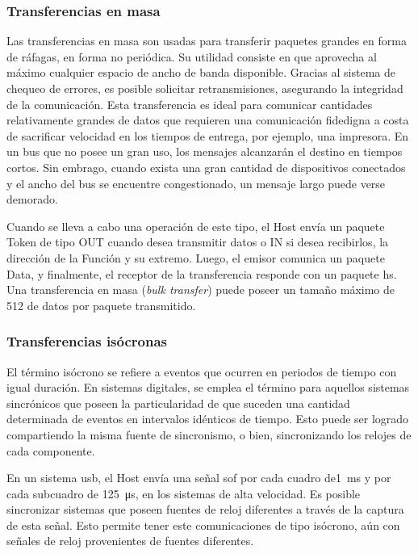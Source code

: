 \subsubsection{Transferencias en masa}
	Las transferencias en masa son usadas para transferir paquetes grandes en forma de ráfagas, en forma no periódica. Su utilidad consiste en que aprovecha al máximo cualquier espacio de ancho de banda disponible. Gracias al sistema de chequeo de errores, es posible solicitar retransmisiones, asegurando la integridad de la comunicación. Esta transferencia es ideal para comunicar cantidades relativamente grandes de datos que requieren una comunicación fidedigna a costa de sacrificar velocidad en los tiempos de entrega, por ejemplo, una impresora. En un bus que no posee un gran uso, los mensajes alcanzarán el destino en tiempos cortos. Sin embrago, cuando exista una gran cantidad de dispositivos conectados y el ancho del bus se encuentre congestionado, un mensaje largo puede verse demorado.%

	Cuando se lleva a cabo una operación de este tipo, el Host envía un paquete Token de tipo OUT cuando desea transmitir datos o IN si desea recibirlos, la dirección de la Función y su extremo. Luego, el emisor comunica un paquete Data, y finalmente, el receptor de la transferencia responde con un paquete \acrshort{hs}. Una transferencia en masa ({\it bulk transfer}) puede poseer un tamaño máximo de \SI{512}{\byte} de datos por paquete transmitido.
	
\subsubsection{Transferencias isócronas}
	El término isócrono se refiere a eventos que ocurren en periodos de tiempo con igual duración. En sistemas digitales, se emplea el término para aquellos sistemas sincrónicos que poseen la particularidad de que suceden una cantidad determinada de eventos en intervalos idénticos de tiempo. Esto puede ser logrado compartiendo la misma fuente de sincronismo, o bien, sincronizando los relojes de cada componente. 
	
	En un sistema \acrshort{usb}, el Host envía una señal \acrshort{sof} por cada cuadro de\SI{1}{\milli\second} y por cada subcuadro de  \SI{125}{\micro\second}, en los sistemas de alta velocidad. Es posible sincronizar sistemas que poseen fuentes de reloj diferentes a través de la captura de esta señal. Esto permite tener este comunicaciones de tipo isócrono, aún con señales de reloj provenientes de fuentes diferentes.%
	
